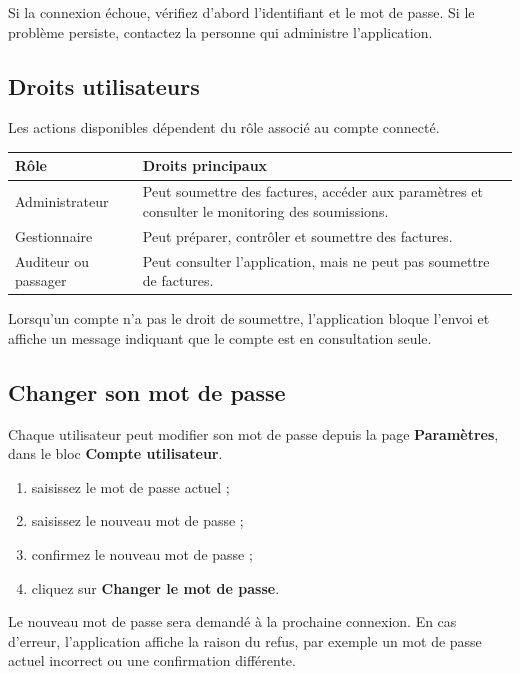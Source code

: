 \documentclass[11pt,a4paper]{article}
\begin{document}
Si la connexion échoue, vérifiez d'abord l'identifiant et le mot de passe. Si le
problème persiste, contactez la personne qui administre l'application.

\subsection{Droits utilisateurs}

Les actions disponibles dépendent du rôle associé au compte connecté.

\begin{longtable}{|p{}|p{}|}
  \hline
  \textbf{Rôle} & \textbf{Droits principaux} \\
  \hline
  Administrateur &
  Peut soumettre des factures, accéder aux paramètres et consulter le monitoring
  des soumissions. \\
  \hline
  Gestionnaire &
  Peut préparer, contrôler et soumettre des factures. \\
  \hline
  Auditeur ou passager &
  Peut consulter l'application, mais ne peut pas soumettre de factures. \\
  \hline
\end{longtable}

Lorsqu'un compte n'a pas le droit de soumettre, l'application bloque l'envoi et
affiche un message indiquant que le compte est en consultation seule.

\subsection{Changer son mot de passe}

Chaque utilisateur peut modifier son mot de passe depuis la page
\textbf{Paramètres}, dans le bloc \textbf{Compte utilisateur}.

\begin{enumerate}
  \item saisissez le mot de passe actuel ;
  \item saisissez le nouveau mot de passe ;
  \item confirmez le nouveau mot de passe ;
  \item cliquez sur \textbf{Changer le mot de passe}.
\end{enumerate}

Le nouveau mot de passe sera demandé à la prochaine connexion. En cas d'erreur,
l'application affiche la raison du refus, par exemple un mot de passe actuel
incorrect ou une confirmation différente.
\end{document}
